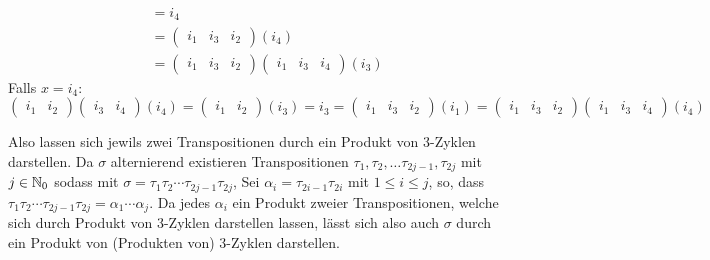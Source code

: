 \documentclass[sectionformat = aufgabe]{gadsescript}
\begin{document}
\begin{enumerate}[label=(\alph*)]
\begin{description}
\begin{align*}
					~ & = i_4 \\
					~ & = \begin{pmatrix} i_1 & i_3 & i_2 \end{pmatrix} (i_4) \\
					~ & = \begin{pmatrix} i_1 & i_3 & i_2 \end{pmatrix} \begin{pmatrix} i_1 & i_3 & i_4 \end{pmatrix} (i_3)
				\end{align*}
				Falls $ x = i_4 $:
				\[
					\begin{pmatrix} i_1 & i_2 \end{pmatrix} \begin{pmatrix} i_3 & i_4 \end{pmatrix} (i_4) = \begin{pmatrix} i_1 & i_2 \end{pmatrix} (i_3) = i_3 = \begin{pmatrix} i_1 & i_3 & i_2 \end{pmatrix} (i_1) = \begin{pmatrix} i_1 & i_3 & i_2 \end{pmatrix} \begin{pmatrix} i_1 & i_3 & i_4 \end{pmatrix} (i_4)
				\]
		\end{description}
		Also lassen sich jewils zwei Transpositionen durch ein Produkt von 3-Zyklen darstellen.
		Da $ \sigma $ alternierend existieren Transpositionen $ \tau_1, \tau_2, \dotsc \tau_{2j - 1}, \tau_{2j} $ mit $ j \in \mathbb{N} _0 $ sodass mit $ \sigma = \tau_1 \tau_2 \dotsb \tau_{2j - 1} \tau_{2j}  $, Sei $ \alpha_i = \tau_{2i - 1} \tau_{2i}  $ mit $ 1 \leq i \leq j $, so, dass $ \tau_1 \tau_2 \dotsb \tau_{2j - 1} \tau_{2j} = \alpha_1 \dotsb \alpha_j $.
		Da jedes $ \alpha_i $ ein Produkt zweier Transpositionen, welche sich durch Produkt von 3-Zyklen darstellen lassen, lässt sich also auch $ \sigma $ durch ein Produkt von (Produkten von) 3-Zyklen darstellen.
\end{enumerate}
\end{document}
